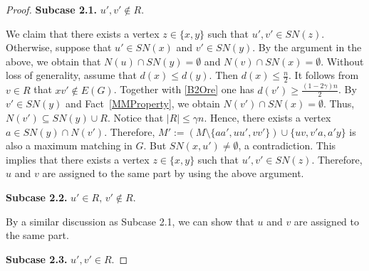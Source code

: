 \documentclass[10pt,a4paper]{amsart}
\begin{document}
\begin{proof}
\medskip
{\bf Subcase 2.1.} $u',v'\notin R$.
\medskip

We claim that there exists a vertex $z\in \{x,y\}$ such that 
$
u',v'\in SN(z).
$ 
Otherwise, suppose that $u'\in SN(x)$ and $v'\in SN(y)$. By the argument in the above,  we obtain that $N(u)\cap SN(y)=\emptyset$ and $N(v)\cap SN(x)=\emptyset$. %
Without loss of generality, assume that $d(x)\le d(y)$. Then $d(x)\le \frac{n}{2}$. It follows from $v\in R$ that $xv'\notin E(G)$. Together with  \eqref{B2Ore} one has $d(v')\geq \frac{(1-2\gamma)n}{2}$. By $v'\in SN(y)$ and Fact~\ref{MMProperty}, we obtain $N(v')\cap SN(x)=\emptyset$. Thus,  $N(v')\subseteq SN(y)\cup R$. Notice that $|R|\leq \gamma n$.  Hence, there exists a vertex $a\in SN(y)\cap N(v')$. Therefore, $M':=(M\setminus \{aa',uu',vv'\})\cup \{uv,v'a,a'y\}$ is also a maximum matching in $G$. But $SN(x,u')\neq \emptyset$, a contradiction. This implies that there exists a vertex $z\in \{x,y\}$ such that 
$
u',v'\in SN(z). 
$
Therefore, $u$ and $v$ are assigned to the same part by using the above argument. 


\medskip
{\bf Subcase 2.2.} $u'\in R,\,v'\notin R$.
\medskip

By a similar discussion as Subcase 2.1, we can show that $u$ and $v$ are assigned to the same part. %

\medskip
{\bf Subcase 2.3.} $u',v'\in R$.
\medskip


\end{proof}
\end{document}
